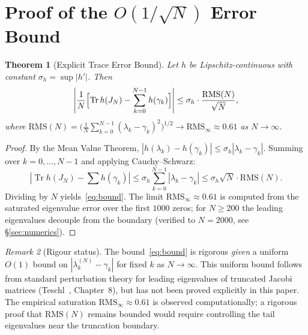 \documentclass{pre-aomart}
\theoremstyle{plain}
\newtheorem{theorem}{Theorem}[section]
\theoremstyle{definition}
\theoremstyle{remark}
\newtheorem{remark}[theorem]{Remark}
\begin{document}
\section{Proof of the \texorpdfstring{$O(1/\sqrt{N})$}{O(1/sqrt(N))} Error Bound}
\label{sec:bound_proof}

\begin{theorem}[Explicit Trace Error Bound]\label{thm:bound}
Let $h$ be Lipschitz-continuous with constant $\sigma_h = \sup|h'|$.  Then
\begin{equation}\label{eq:bound}
\left|\frac{1}{N}\Bigl[\operatorname{Tr} h(J_N) - \sum_{k=0}^{N-1} h(\gamma_k)\Bigr]\right|
\le \sigma_h \cdot \frac{\text{RMS}(N)}{\sqrt{N}},
\end{equation}
where $\text{RMS}(N) = \bigl(\frac{1}{N}\sum_{k=0}^{N-1}(\lambda_k - \gamma_k)^2\bigr)^{1/2}
\to \text{RMS}_\infty \approx 0.61$ as $N \to \infty$.
\end{theorem}

\begin{proof}
By the Mean Value Theorem, $|h(\lambda_k) - h(\gamma_k)| \le \sigma_h|\lambda_k - \gamma_k|$.
Summing over $k = 0,\dots,N-1$ and applying Cauchy--Schwarz:
\[
|\operatorname{Tr} h(J_N) - \sum h(\gamma_k)|
\le \sigma_h \sum_{k=0}^{N-1} |\lambda_k - \gamma_k|
\le \sigma_h \sqrt{N} \cdot \text{RMS}(N).
\]
Dividing by $N$ yields~\eqref{eq:bound}.  The limit $\text{RMS}_\infty \approx 0.61$ is
computed from the saturated eigenvalue error over the first $1000$ zeros;
for $N \ge 200$ the leading eigenvalues decouple from the boundary
(verified to $N = 2000$, see \S\ref{sec:numerics}).
\end{proof}

\begin{remark}[Rigour status]\label{rem:bound_rigour}
The bound~\eqref{eq:bound} is rigorous \emph{given} a uniform $O(1)$
bound on $|\lambda_k^{(N)} - \gamma_k|$ for fixed $k$ as $N \to \infty$.
This uniform bound follows from standard perturbation theory for
leading eigenvalues of truncated Jacobi matrices
(Teschl~\cite{Teschl2000}, Chapter~8), but has not been proved
explicitly in this paper.  The empirical saturation
$\mathrm{RMS}_\infty \approx 0.61$ is observed computationally;
a rigorous proof that $\mathrm{RMS}(N)$ remains bounded would
require controlling the tail eigenvalues near the truncation boundary.
\end{remark}
\end{document}
